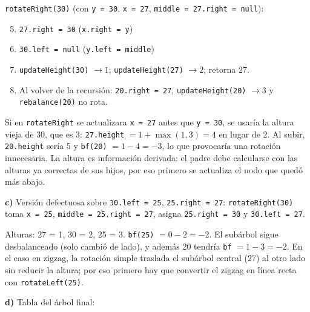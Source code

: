 \documentclass[11pt,a4paper]{article}
\begin{document}
\texttt{rotateRight(30)} (con \texttt{y = 30}, \texttt{x = 27}, \texttt{middle = 27.right = null}):
\begin{enumerate}[itemsep=0pt]
\setcounter{enumi}{4}
\item \texttt{27.right = 30} \quad (\texttt{x.right = y})
\item \texttt{30.left = null} \quad (\texttt{y.left = middle})
\item \texttt{updateHeight(30)} $\to 1$; \texttt{updateHeight(27)} $\to 2$; retorna 27.
\item Al volver de la recursión: \texttt{20.right = 27}, \texttt{updateHeight(20)} $\to 3$ y \texttt{rebalance(20)} no rota.
\end{enumerate}

Si en \texttt{rotateRight} se actualizara \texttt{x = 27} antes que \texttt{y = 30}, se usaría la altura vieja de 30, que es 3: \texttt{27.height} $= 1 + \max(1, 3) = 4$ en lugar de 2. Al subir, \texttt{20.height} sería 5 y \texttt{bf(20)} $= 1 - 4 = -3$, lo que provocaría una rotación innecesaria. La altura es información derivada: el padre debe calcularse con las alturas ya correctas de sus hijos, por eso primero se actualiza el nodo que quedó más abajo.

\textbf{c)} Versión defectuosa sobre \texttt{30.left = 25}, \texttt{25.right = 27}: \texttt{rotateRight(30)} toma \texttt{x = 25}, \texttt{middle = 25.right = 27}, asigna \texttt{25.right = 30} y \texttt{30.left = 27}.

\begin{center}
\end{center}

Alturas: 27 = 1, 30 = 2, 25 = 3. \texttt{bf(25)} $= 0 - 2 = -2$. El subárbol sigue desbalanceado (solo cambió de lado), y además 20 tendría \texttt{bf} $= 1 - 3 = -2$. En el caso en zigzag, la rotación simple traslada el subárbol central (27) al otro lado sin reducir la altura; por eso primero hay que convertir el zigzag en línea recta con \texttt{rotateLeft(25)}.

\textbf{d)} Tabla del árbol final:
\end{document}
